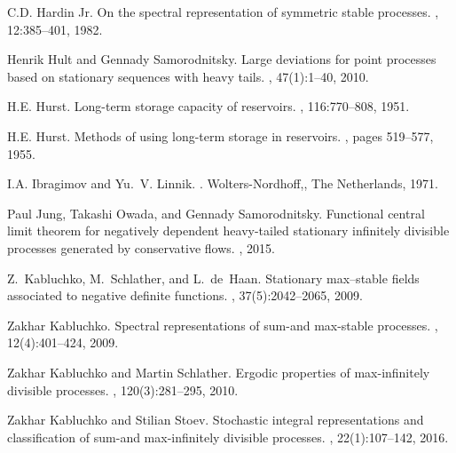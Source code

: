 \documentclass[12pt]{amsart}
\begin{document}
\begin{thebibliography}{10}
	C.D. {Hardin Jr.}
	\newblock On the spectral representation of symmetric stable processes.
	, 12:385--401, 1982.
	
	Henrik Hult and Gennady Samorodnitsky.
	\newblock Large deviations for point processes based on stationary sequences
	with heavy tails.
	, 47(1):1--40, 2010.
	
	H.E. Hurst.
	\newblock Long-term storage capacity of reservoirs.
	,
	116:770--808, 1951.
	
	H.E. Hurst.
	\newblock Methods of using long-term storage in reservoirs.
	,
	pages 519--577, 1955.
	
	I.A. Ibragimov and Yu.~V. Linnik.
	.
	\newblock Wolters-Nordhoff,, The Netherlands, 1971.
	
	Paul Jung, Takashi Owada, and Gennady Samorodnitsky.
	\newblock Functional central limit theorem for negatively dependent
	heavy-tailed stationary infinitely divisible processes generated by
	conservative flows.
	, 2015.
	
	Z.\ Kabluchko, M.\ Schlather, and L.\ de~Haan.
	\newblock Stationary max--stable fields associated to negative definite
	functions.
	, 37(5):2042--2065, 2009.
	
	Zakhar Kabluchko.
	\newblock Spectral representations of sum-and max-stable processes.
	, 12(4):401--424, 2009.
	
	Zakhar Kabluchko and Martin Schlather.
	\newblock Ergodic properties of max-infinitely divisible processes.
	, 120(3):281--295,
	2010.
	
	Zakhar Kabluchko and Stilian Stoev.
	\newblock Stochastic integral representations and classification of sum-and
	max-infinitely divisible processes.
	, 22(1):107--142, 2016.
	

\end{thebibliography}
\end{document}
